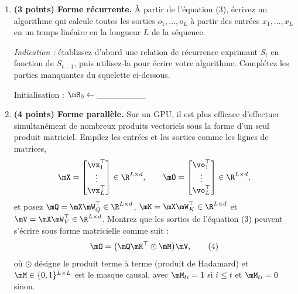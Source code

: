 \documentclass[12pt]{article}
\theoremstyle{definition}
\newcommand{\blank}{\underline{\hspace{2.1cm}}}
\begin{document}
\begin{enumerate}[start=2]
\item \textbf{(3 points) Forme récurrente.} À partir de l'équation (3), écrivez un algorithme qui calcule toutes les sorties $o_1,\ldots,o_L$ à partir des entrées $x_1,\ldots,x_L$ en un temps linéaire en la longueur $L$ de la séquence.

\textit{Indication :} établissez d'abord une relation de récurrence exprimant $S_t$ en fonction de $S_{t-1}$, puis utilisez-la pour écrire votre algorithme. Complétez les parties manquantes du squelette ci-dessous.

\begin{minipage}{\linewidth}
    \begin{algorithm}[H]
    \DontPrintSemicolon
    Initialisation : $\mS_{0} \leftarrow \blank$\;
    \caption{Attention linéaire, forme récurrente}
    \label{alg:linear-rnn}
    \end{algorithm}
\end{minipage}



\item \textbf{(4 points) Forme parallèle.} Sur un GPU, il est plus efficace d'effectuer simultanément de nombreux produits vectoriels sous la forme d'un seul produit matriciel. Empilez les entrées et les sorties comme les lignes de matrices,
\[
\mX=\begin{bmatrix}\vx_1^\top\\\vdots\\\vx_L^\top\end{bmatrix}\in\R^{L\times d},\qquad
\mO=\begin{bmatrix}\vo_1^\top\\\vdots\\\vo_L^\top\end{bmatrix}\in\R^{L\times d},
\]
et posez $\mQ=\mX\mW_Q^\top\in\R^{L\times d}$, $\mK=\mX\mW_K^\top\in\R^{L\times d}$ et $\mV=\mX\mW_V^\top\in\R^{L\times d}$. Montrez que les sorties de l'équation (3) peuvent s'écrire sous forme matricielle comme suit :
\begin{equation}\mO=\bigl(\mQ\mK^\top\odot \mM\bigr)\mV,\tag{4}\end{equation}
où $\odot$ désigne le produit terme à terme (produit de Hadamard) et $\mM\in\{0,1\}^{L\times L}$ est le masque causal, avec $\mM_{ti}=1$ si $i\le t$ et $\mM_{ti}=0$ sinon.


\end{enumerate}
\end{document}
